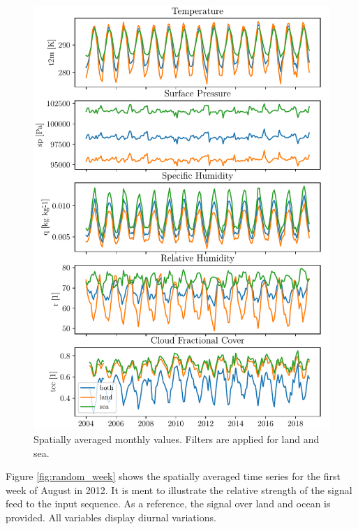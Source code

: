 \begin{figure}[ht]
    \centering
    \includegraphics{python_figs/monthly_means.pdf}
    \caption{Spatially averaged monthly values. Filters are applied for land and sea.}
    \label{fig:monthly_mean_ts_vars}
\end{figure}

Figure \ref{fig:random_week} shows the spatially averaged time series for the first week of August in 2012. It is ment to illustrate the relative strength of the signal feed to the input sequence. As a reference, the signal over land and ocean is provided. All variables display diurnal variations.

